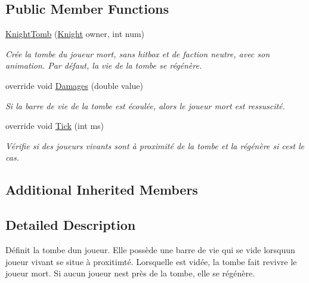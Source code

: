 \subsection*{Public Member Functions}
\begin{DoxyCompactItemize}
\item 
\hyperlink{class_tentacle_slicers_1_1customs_1_1_knight_tomb_a6a12111b657c9fcba696204f19c6fb76}{Knight\+Tomb} (\hyperlink{class_tentacle_slicers_1_1customs_1_1_knight}{Knight} owner, int num)
\begin{DoxyCompactList}\small\item\em Crée la tombe du joueur mort, sans hitbox et de faction neutre, avec son animation. Par défaut, la vie de la tombe se régénère. \end{DoxyCompactList}\item 
override void \hyperlink{class_tentacle_slicers_1_1customs_1_1_knight_tomb_a5a34249a8265891f3c3eb6d469f11b93}{Damages} (double value)
\begin{DoxyCompactList}\small\item\em Si la barre de vie de la tombe est écoulée, alors le joueur mort est ressuscité. \end{DoxyCompactList}\item 
override void \hyperlink{class_tentacle_slicers_1_1customs_1_1_knight_tomb_a2494934e67c63f70623b7ff47a4248f8}{Tick} (int ms)
\begin{DoxyCompactList}\small\item\em Vérifie si des joueurs vivants sont à proximité de la tombe et la régénère si c\textquotesingle{}est le cas. \end{DoxyCompactList}\end{DoxyCompactItemize}
\subsection*{Additional Inherited Members}


\subsection{Detailed Description}
Définit la tombe d\textquotesingle{}un joueur. Elle possède une barre de vie qui se vide lorsqu\textquotesingle{}un joueur vivant se situe à proxitimté. Lorsqu\textquotesingle{}elle est vidée, la tombe fait revivre le joueur mort. Si aucun joueur n\textquotesingle{}est près de la tombe, elle se régénère. 



